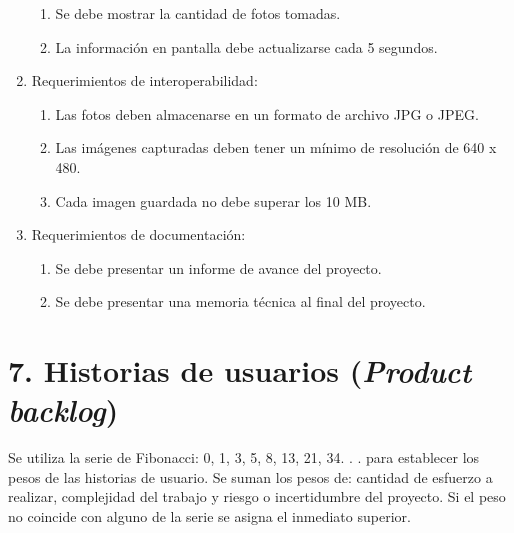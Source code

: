 \documentclass[
11pt, %
]{charter}
\begin{document}
\begin{enumerate}
\begin{enumerate}
            \item Se debe mostrar la cantidad de fotos tomadas.
            \item La información en pantalla debe actualizarse cada 5 segundos.
		\end{enumerate}
        \newpage
    \item Requerimientos de interoperabilidad:
		\begin{enumerate}
			\item Las fotos deben almacenarse en un formato de archivo JPG o JPEG.
			\item Las imágenes capturadas deben tener un mínimo de resolución de 640 x 480.
            \item Cada imagen guardada no debe superar los 10 MB.
		\end{enumerate}
    \item Requerimientos de documentación:
		\begin{enumerate}
			\item Se debe presentar un informe de avance del proyecto.
			\item Se debe presentar una memoria técnica al final del proyecto.
		\end{enumerate}
\end{enumerate}


\section{7. Historias de usuarios (\textit{Product backlog})}
\label{sec:backlog}

Se utiliza la serie de Fibonacci: 0, 1, 3, 5, 8, 13, 21, 34. . . para establecer los pesos de las historias de usuario. Se suman los pesos de: cantidad de esfuerzo a realizar, complejidad del trabajo y riesgo o incertidumbre del proyecto. Si el peso no coincide con alguno de la serie se asigna el inmediato superior.
\end{document}
